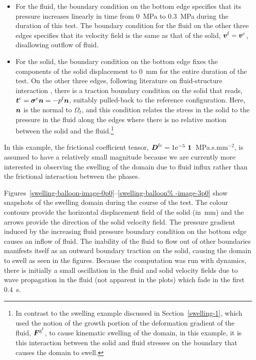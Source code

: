 \begin{itemize}
\item For the fluid, the boundary condition on the bottom edge
  specifies that its pressure increases linearly in time from 0~MPa to
  0.3~MPa during the duration of this test. The boundary condition for
  the fluid on the other three edges specifies that its velocity field
  is the same as that of the solid, $\mbox{\boldmath$ v$}^{\mathrm{f}} =
  \mbox{\boldmath$ v$}^{\mathrm{c}}$, disallowing outflow of fluid.
\item For the solid, the boundary condition on the bottom edge fixes
  the components of the solid displacement to 0~mm for the entire
  duration of the test. On the other three edges, following literature
  on fluid-structure interaction \citep{doneaetal2004}, there is a
  traction boundary condition on the solid that reads,
  $\mbox{\boldmath$ t$}^{\mathrm{c}}=\mbox{\boldmath$\sigma$}^{\mathrm{c}} \mbox{\boldmath$ n$} = -p^{\mathrm{f}} \mbox{\boldmath$ n$}$,
  suitably pulled-back to the reference configuration. Here, $\mbox{\boldmath$ n$}$ is
  the normal to $\Omega_{t}$, and this condition relates the stress in
  the solid to the pressure in the fluid along the edges where there
  is no relative motion between the solid and the fluid.\footnote{In
    contrast to the swelling example discussed in
    Section~\ref{swelling-1}, which used the notion of the growth
    portion of the deformation gradient of the fluid,
    $\mbox{\boldmath$ F$}^{\mathrm{g}^\mathrm{f}}$, to cause kinematic swelling of the
    domain, in this example, it is this interaction between the solid
    and fluid stresses on the boundary that causes the domain to
    swell.}
\end{itemize}

In this example, the frictional coefficient tensor, $\bD^{\mathrm{fc}}
= 1\mathrm{e}^{-5} \ \bone$~MPa.s.mm$^{-2}$, is assumed to have a
relatively small magnitude because we are currently more interested in
observing the swelling of the domain due to fluid influx rather than
the frictional interaction between the phases.

Figures~\ref{swelling-balloon-image-0p0}--\ref{swelling-balloon%
  -image-3p0} show snapshots of the swelling domain during the course
of the test. The colour contours provide the horizontal displacement
field of the solid (in~mm) and the arrows provide the direction of the
solid velocity field. The pressure gradient induced by the increasing
fluid pressure boundary condition on the bottom edge causes an inflow
of fluid. The inability of the fluid to flow out of other boundaries
manifests itself as an outward boundary traction on the solid, causing
the domain to swell as seen in the figures.  Because the computation
was run with dynamics, there is initially a small oscillation in the
fluid and solid velocity fields due to wave propagation in the fluid
(not apparent in the plots) which fade in the first 0.4~s.

